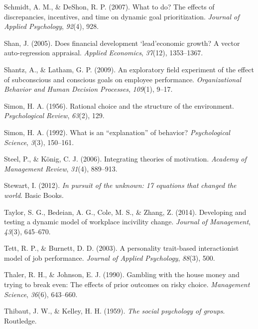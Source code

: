 \documentclass[english,,man]{apa6}
\theoremstyle{definition}
\theoremstyle{definition}
\theoremstyle{definition}
\theoremstyle{remark}
\begin{document}
\leavevmode\hypertarget{ref-schmidt2007}{}%
Schmidt, A. M., \& DeShon, R. P. (2007). What to do? The effects of
discrepancies, incentives, and time on dynamic goal prioritization.
\emph{Journal of Applied Psychology}, \emph{92}(4), 928.

\leavevmode\hypertarget{ref-shan2005}{}%
Shan, J. (2005). Does financial development `lead'economic growth? A
vector auto-regression appraisal. \emph{Applied Economics},
\emph{37}(12), 1353--1367.

\leavevmode\hypertarget{ref-shantz2009}{}%
Shantz, A., \& Latham, G. P. (2009). An exploratory field experiment of
the effect of subconscious and conscious goals on employee performance.
\emph{Organizational Behavior and Human Decision Processes},
\emph{109}(1), 9--17.

\leavevmode\hypertarget{ref-simon1956}{}%
Simon, H. A. (1956). Rational choice and the structure of the
environment. \emph{Psychological Review}, \emph{63}(2), 129.

\leavevmode\hypertarget{ref-simon1992}{}%
Simon, H. A. (1992). What is an ``explanation'' of behavior?
\emph{Psychological Science}, \emph{3}(3), 150--161.

\leavevmode\hypertarget{ref-steel2006}{}%
Steel, P., \& König, C. J. (2006). Integrating theories of motivation.
\emph{Academy of Management Review}, \emph{31}(4), 889--913.

\leavevmode\hypertarget{ref-stewart2012}{}%
Stewart, I. (2012). \emph{In pursuit of the unknown: 17 equations that
changed the world}. Basic Books.

\leavevmode\hypertarget{ref-taylor2014}{}%
Taylor, S. G., Bedeian, A. G., Cole, M. S., \& Zhang, Z. (2014).
Developing and testing a dynamic model of workplace incivility change.
\emph{Journal of Management}, \emph{43}(3), 645--670.

\leavevmode\hypertarget{ref-tett2003}{}%
Tett, R. P., \& Burnett, D. D. (2003). A personality trait-based
interactionist model of job performance. \emph{Journal of Applied
Psychology}, \emph{88}(3), 500.

\leavevmode\hypertarget{ref-thaler1990}{}%
Thaler, R. H., \& Johnson, E. J. (1990). Gambling with the house money
and trying to break even: The effects of prior outcomes on risky choice.
\emph{Management Science}, \emph{36}(6), 643--660.

\leavevmode\hypertarget{ref-thibaut1959}{}%
Thibaut, J. W., \& Kelley, H. H. (1959). \emph{The social psychology of
groups}. Routledge.
\end{document}
